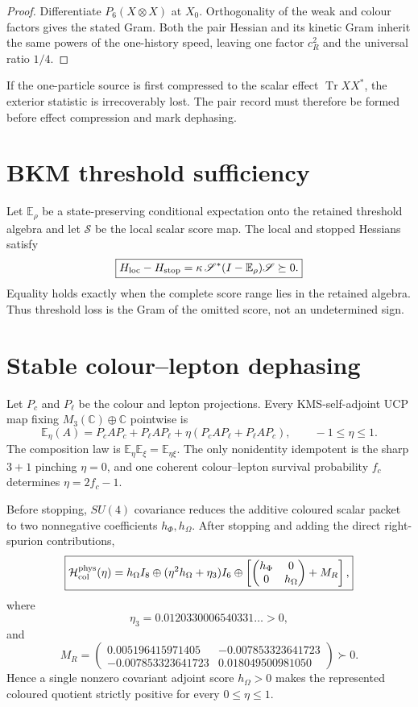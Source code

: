 \documentclass[11pt,oneside,openany]{book}
\numberwithin{equation}{chapter}
\theoremstyle{definition}
\theoremstyle{remark}
\newcommand{\C}{\mathbb C}
\newcommand{\Tr}{\operatorname{Tr}}
\begin{document}
\begin{proof}
Differentiate \(P_6(X\otimes X)\) at \(X_0\).  Orthogonality of the weak and
colour factors gives the stated Gram.  Both the pair Hessian and its kinetic
Gram inherit the same powers of the one-history speed, leaving one factor
\(c_R^2\) and the universal ratio \(1/4\).
\end{proof}

If the one-particle source is first compressed to the scalar effect
\(\Tr XX^*\), the exterior statistic is irrecoverably lost.  The pair record
must therefore be formed before effect compression and mark dephasing.

\section{BKM threshold sufficiency}
Let \(\mathbb E_\rho\) be a state-preserving conditional expectation onto the
retained threshold algebra and let \(\mathscr S\) be the local scalar score
map.  The local and stopped Hessians satisfy
\[
 \boxed{
 H_{\rm loc}-H_{\rm stop}
 =\kappa\,\mathscr S^*(I-\mathbb E_\rho)\mathscr S\succeq0.}
\]
Equality holds exactly when the complete score range lies in the retained
algebra.  Thus threshold loss is the Gram of the omitted score, not an
undetermined sign.

\section{Stable colour--lepton dephasing}
Let \(P_c\) and \(P_\ell\) be the colour and lepton projections.  Every
KMS-self-adjoint UCP map fixing
\(M_3(\C)\oplus\C\) pointwise is
\[
 \boxed{
 \mathbb E_\eta(A)
 =P_cAP_c+P_\ell AP_\ell
 +\eta(P_cAP_\ell+P_\ell AP_c),
 \qquad -1\le\eta\le1.}
\]
The composition law is \(\mathbb E_\eta\mathbb E_\xi=\mathbb E_{\eta\xi}\).
The only nonidentity idempotent is the sharp \(3+1\) pinching \(\eta=0\), and
one coherent colour--lepton survival probability \(f_c\) determines
\(\eta=2f_c-1\).

Before stopping, \(SU(4)\) covariance reduces the additive coloured scalar
packet to two nonnegative coefficients \(h_\Phi,h_\Omega\).  After stopping
and adding the direct right-spurion contributions,
\[
 \boxed{
 \mathcal H_{\rm col}^{\rm phys}(\eta)
 =h_\Omega I_8
 \oplus(\eta^2h_\Omega+\eta_3)I_6
 \oplus\left[
 \begin{pmatrix}h_\Phi&0\\0&h_\Omega\end{pmatrix}+M_R
 \right],}
\]
where
\[
 \eta_3=0.0120330006540331\ldots>0,
\]
and
\[
 M_R=
 \begin{pmatrix}
 0.005196415971405&-0.007853323641723\\
 -0.007853323641723&0.018049500981050
 \end{pmatrix}\succ0.
\]
Hence a single nonzero covariant adjoint score \(h_\Omega>0\) makes the
represented coloured quotient strictly positive for every
\(0\le\eta\le1\).
\end{document}
